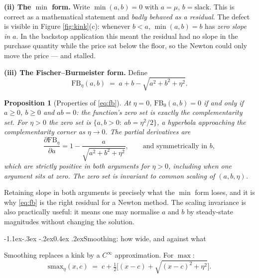 \documentclass[10pt,a4paper]{article}
\makeatletter
\theoremstyle{definition}
\theoremstyle{plain}
\newtheorem{prop}[defn]{Proposition}
\theoremstyle{remark}
\newcommand{\half}{\tfrac{1}{2}}
\renewcommand\subsection{\@startsection{subsection}{2}{\z@}%
  {-1.1ex\@plus -.3ex \@minus -.2ex}{0.4ex \@plus .2ex}{\normalfont\normalsize\bfseries}}
\makeatother
\begin{document}
\textbf{(ii) The $\min$ form.} Write $\min(a,b) = 0$ with $a=\mu$, $b=\text{slack}$. This is
correct as a mathematical statement and \emph{badly behaved as a residual}. The defect is
visible in Figure \ref{fig:kink}(c): whenever $b<a$, $\min(a,b)=b$ has \emph{zero slope in
$a$}. In the backstop application this meant the residual had no slope in the purchase
quantity while the price sat below the floor, so the Newton could only move the price --- and
stalled.

\textbf{(iii) The Fischer--Burmeister form.} Define
\begin{equation}
  \mathrm{FB}_\eta(a,b) \;=\; a + b - \sqrt{a^2+b^2+\eta^2}.
  \label{eq:fb}
\end{equation}
\begin{prop}[Properties of \eqref{eq:fb}]
At $\eta=0$, $\mathrm{FB}_0(a,b)=0$ if and only if $a\ge0$, $b\ge0$ and $ab=0$: the function's
zero set is exactly the complementarity set. For $\eta>0$ the zero set is
$\{a,b>0:\ ab = \eta^2/2\}$, a hyperbola approaching the complementarity corner as
$\eta\to0$. The partial derivatives are
\begin{equation}
  \frac{\partial \mathrm{FB}_\eta}{\partial a} = 1 - \frac{a}{\sqrt{a^2+b^2+\eta^2}},
  \qquad\text{and symmetrically in } b,
\end{equation}
which are \emph{strictly positive in both arguments} for $\eta>0$, including when one argument
sits at zero. The zero set is invariant to common scaling of $(a,b,\eta)$.
\end{prop}
\noindent Retaining slope in both arguments is precisely what the $\min$ form loses, and it is
why \eqref{eq:fb} is the right residual for a Newton method. The scaling invariance is also
practically useful: it means one may normalise $a$ and $b$ by steady-state magnitudes without
changing the solution.

\subsection{Smoothing: how wide, and against what}
\label{sec:smoothing}

Smoothing replaces a kink by a $C^\infty$ approximation. For $\max$:
\begin{equation}
  \mathrm{smax}_\eta(x,c) \;=\; c + \half\Big[(x-c) + \sqrt{(x-c)^2+\eta^2}\Big].
  \label{eq:smax}
\end{equation}
\end{document}
